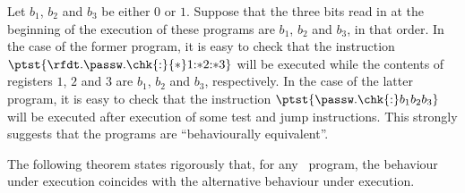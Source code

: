 \documentclass[fleqn]{llncs}
\begin{document}
\begin{example}
Let $b_1$, $b_2$ and $b_3$ be either $0$ or $1$.
Suppose that the three bits read in at the beginning of the execution of
these programs are $b_1$, $b_2$ and $b_3$, in that order.
In the case of the former program, it is easy to check that the
instruction $\ptst{\rfdt.\passw.\chk{:}{*}1{:}{*}2{:}{*}3}$ will be
executed while the contents of registers $1$, $2$ and $3$ are $b_1$,
$b_2$ and $b_3$, respectively.
In the case of the latter program, it is easy to check that the
instruction $\ptst{\passw.\chk{:}b_1b_2b_3}$ will be executed after
execution of some test and jump instructions.
This strongly suggests that the programs are ``behaviourally
equivalent''.
\end{example}

The following theorem states rigorously that, for any \PGLDdii\ program,
the behaviour under execution coincides with the alternative behaviour
under execution.
\end{document}
